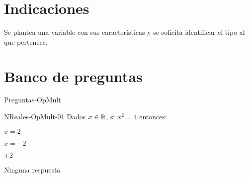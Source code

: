 \documentclass[a4,11pt]{aleph-notas}
\begin{document}
\encabezado

\vspace*{-8mm}
\section{Indicaciones}

Se plantea una variable con sus características y se solicita identificar el tipo al que pertenece.

\section{Banco de preguntas}

\begin{quiz}{Preguntas-OpMult}

\begin{multi}[]%
    {NReales-OpMult-01}
    Dados $x\in \mathbb{R}$, si $x^2=4$ entonces:
    \item $x=2$
    \item $x=-2$
    \item* $\pm 2$
    \item Ninguna respuesta
\end{multi}



\end{quiz}
\end{document}
